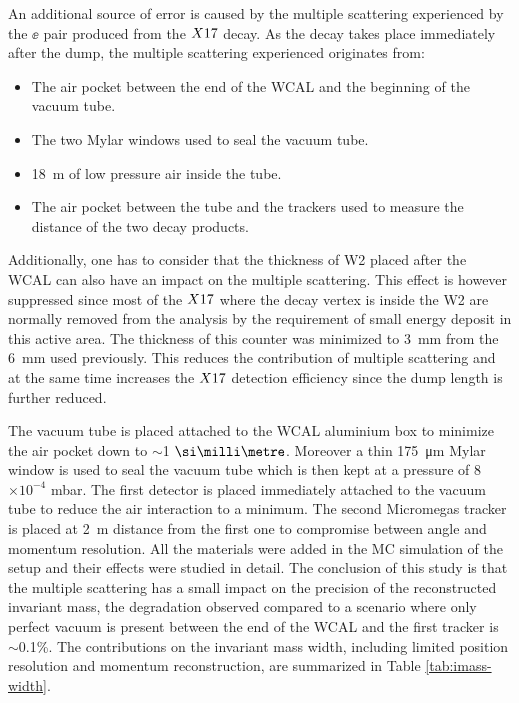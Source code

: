 An additional source of error is caused by the multiple scattering experienced by the $\ee$ pair produced from the $X17$ decay. As the decay takes place immediately after the dump, the multiple scattering experienced originates from:

\begin{itemize}
\item The air pocket between the end of the WCAL and the beginning of the vacuum tube.
\item The two Mylar windows used to seal the vacuum tube.
\item \SI{18}{\meter} of low pressure air inside the tube.
\item The air pocket between the tube and the trackers used to measure the distance of the two decay products.
\end{itemize}

Additionally, one has to consider that the thickness of W2 placed after the WCAL can also have an impact on the multiple scattering. This effect is however suppressed since most of the $X17$ where the decay vertex is inside the W2 are normally removed from the analysis by the requirement of small energy deposit in this active area. The thickness of this counter was minimized to \SI{3}{\milli\meter} from the \SI{6}{\milli\meter} used previously. This reduces the contribution of multiple scattering and at the same time increases the $X17$ detection efficiency since the dump length is further reduced.

The vacuum tube is placed attached to the WCAL aluminium box to minimize the air pocket down to $\sim$1 $\mmi$. Moreover a thin \SI{175}{\micro\meter} Mylar window is used to seal the vacuum tube which is then kept at a pressure of 8$\times 10^{-4}$ \si{\milli\bar}. The first detector is placed immediately attached to the vacuum tube to reduce the air interaction to a minimum. The second Micromegas tracker is placed at \SI{2}{\meter} distance from the first one to compromise between angle and momentum resolution. All the materials were added in the MC simulation of the setup and their effects were studied in detail. The conclusion of this study is that the multiple scattering has a small impact on the precision of the reconstructed invariant mass, the degradation observed compared to a scenario where only perfect vacuum is present between the end of the WCAL and the first tracker is $\sim$0.1\%. The contributions on the invariant mass width, including limited position resolution and momentum reconstruction, are summarized in Table \ref{tab:imass-width}.

